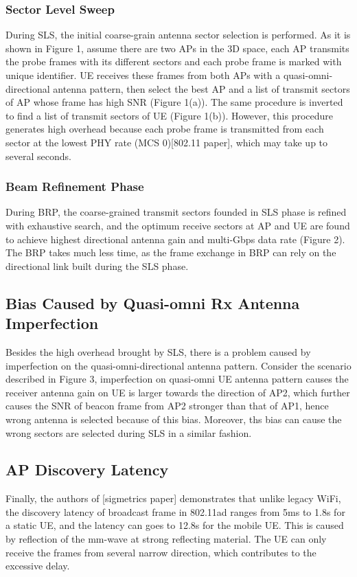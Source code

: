\documentclass[conference]{IEEEtran}
\begin{document}
\subsubsection{Sector Level Sweep}
During SLS, the initial coarse-grain antenna sector selection is performed. As it is shown in Figure 1, assume there are two APs in the 3D space, each AP transmits the probe frames with its different sectors and each probe frame is marked with unique identifier. UE receives these frames from both APs with a quasi-omni-directional antenna pattern, then select the best AP and a list of transmit sectors of AP whose frame has high SNR (Figure 1(a)). The same procedure is inverted to find a list of transmit sectors of UE (Figure 1(b)). However, this procedure generates high overhead because each probe frame is transmitted from each sector at the lowest PHY rate (MCS 0)[802.11 paper], which may take up to several seconds. 

\subsubsection{Beam Refinement Phase}
During BRP, the coarse-grained transmit sectors founded in SLS phase is refined with exhaustive search, and the optimum receive sectors at AP and UE are found to achieve highest directional antenna gain and multi-Gbps data rate (Figure 2). The BRP takes much less time, as the frame exchange in BRP can rely on the directional link built during the SLS phase.

\subsection{Bias Caused by Quasi-omni Rx Antenna Imperfection}
Besides the high overhead brought by SLS, there is a problem caused by imperfection on the quasi-omni-directional antenna pattern. Consider the scenario described in Figure 3, imperfection on quasi-omni UE antenna pattern causes the receiver antenna gain on UE is larger towards the direction of AP2, which further causes the SNR of beacon frame from AP2 stronger than that of AP1, hence wrong antenna is selected because of this bias. Moreover, ths bias can cause the wrong sectors are selected during SLS in a similar fashion.
\subsection{AP Discovery Latency}
Finally, the authors of [sigmetrics paper] demonstrates that unlike legacy WiFi, the discovery latency of broadcast frame in 802.11ad ranges from 5ms to 1.8s for a static UE, and the latency can goes to 12.8s for the mobile UE. This is caused by reflection of the mm-wave at strong reflecting material. The UE can only receive the frames from several narrow direction, which contributes to the excessive delay.
\end{document}
